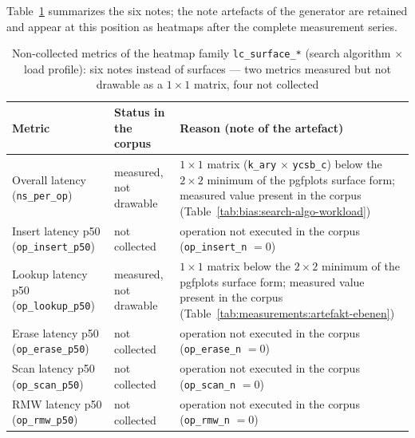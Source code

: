 \ifPlatzhalterAlsTabelle%
Table~\ref{tab:t3:surfaces} summarizes the six notes; the note artefacts of the generator are
retained and appear at this position as heatmaps after the complete measurement series.
\begin{table}[!htbp]
\centering
\small
\begin{tabular}{@{}>{\raggedright\arraybackslash}p{4.4cm}>{\raggedright\arraybackslash}p{3.0cm}>{\raggedright\arraybackslash}p{7.0cm}@{}}
\toprule
Metric & Status in the corpus & Reason (note of the artefact) \\
\midrule
Overall latency (\texttt{ns\_per\_op}) & measured, not drawable & $1{\times}1$ matrix (\texttt{k\_ary} $\times$ \texttt{ycsb\_c}) below the $2{\times}2$ minimum of the pgfplots surface form; measured value present in the corpus (Table~\ref{tab:bias:search-algo-workload}) \\
Insert latency p50 (\texttt{op\_insert\_p50}) & not collected & operation not executed in the corpus (\texttt{op\_insert\_n} $= 0$) \\
Lookup latency p50 (\texttt{op\_lookup\_p50}) & measured, not drawable & $1{\times}1$ matrix below the $2{\times}2$ minimum of the pgfplots surface form; measured value present in the corpus (Table~\ref{tab:measurements:artefakt-ebenen}) \\
Erase latency p50 (\texttt{op\_erase\_p50}) & not collected & operation not executed in the corpus (\texttt{op\_erase\_n} $= 0$) \\
Scan latency p50 (\texttt{op\_scan\_p50}) & not collected & operation not executed in the corpus (\texttt{op\_scan\_n} $= 0$) \\
RMW latency p50 (\texttt{op\_rmw\_p50}) & not collected & operation not executed in the corpus (\texttt{op\_rmw\_n} $= 0$) \\
\bottomrule
\end{tabular}
\caption{Non-collected metrics of the heatmap family \texttt{lc\_surface\_*} (search algorithm $\times$
load profile): six notes instead of surfaces --- two metrics measured but not drawable as a
$1{\times}1$ matrix, four not collected}%
\label{tab:t3:surfaces}
\end{table}
\else






\fi

